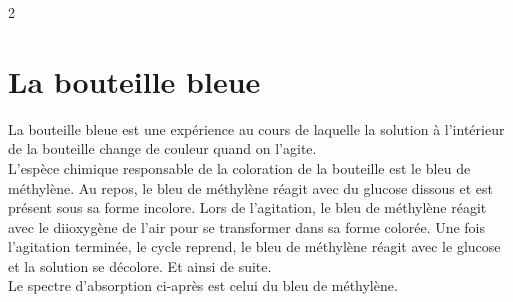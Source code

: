 \documentclass[a4paper,11pt,fleqn]{article}%
\begin{document}
	\maketitle
\begin{multicols}{2}
    \section{La bouteille bleue}
    La bouteille bleue est une expérience au cours de laquelle la solution à l'intérieur de la bouteille change de couleur quand on l'agite.\\
    L'espèce chimique responsable de la coloration de la bouteille est le bleu de méthylène. Au repos, le bleu de méthylène réagit avec du glucose dissous et est présent sous sa forme incolore. Lors de l'agitation, le bleu de méthylène réagit avec le diioxygène de l'air pour se transformer dans sa forme colorée. Une fois l'agitation terminée, le cycle reprend, le bleu de méthylène réagit avec le glucose et la solution se décolore. Et ainsi de suite.\\
    Le spectre d'absorption ci-après est celui du bleu de méthylène.


\end{multicols}
\end{document}
